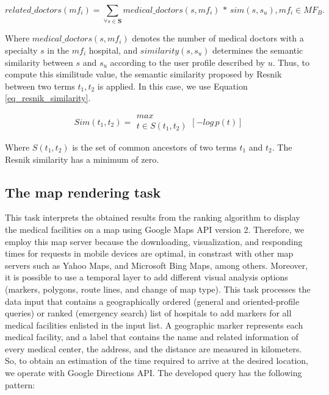 \documentclass[sustainability,article,submit,pdftex,moreauthors]{Definitions/mdpi}
\begin{document}

\begin{center}
\begin{equation}
related\_doctors(mf_{i}) = \sum_{\forall s \in \textbf{S}}medical\_doctors(s, mf_{i})\,\ast\,sim(s, s_u),mf_{i} \in MF_{B}. 
\label{eq_number_medical_doctors}
\end{equation}
\end{center}
 
Where $medical\_doctors(s, mf_{i})$ denotes the number of medical doctors with a specialty $s$ in the $mf_{i}$ hospital, and $similarity(s, s_u)$ determines the semantic similarity between $s$ and $s_u$ according to the user profile described by $u$. Thus, to compute this similitude value, the semantic similarity proposed by Resnik \cite{resnik2011semantic} between two terms $t_1, t_2$ is applied. In this case, we use Equation \ref{eq_resnik_similarity}. 

\begin{center}
\begin{equation}
Sim(t_1, t_2) =  \begin{matrix}{max} \\ {t \in S(t_1, t_2)}\end{matrix}  [-log \, p(t)]  
\label{eq_resnik_similarity}
\end{equation}
\end{center}

Where $S(t_1, t_2)$ is the set of common ancestors of two terms $t_1$ and $t_2$. The Resnik similarity has a minimum of zero.

\subsection{The map rendering task}
This task interprets the obtained results from the ranking algorithm to display the medical facilities on a map using Google Maps API version 2. Therefore, we employ this map server because the downloading, visualization, and responding times for requests in mobile devices are optimal, in constrast with other map servers such as Yahoo Maps, and Microsoft Bing Maps, among others. Moreover, it is possible to use a temporal layer to add different visual analysis options (markers, polygons, route lines, and change of map type). This task processes the data input that contains a geographically ordered (general and oriented-profile queries) or ranked (emergency search) list of hospitals to add markers for all medical facilities enlisted in the input list. A geographic marker represents each medical facility, and a label that contains the name and related information of every medical center, the address, and the distance are measured in kilometers. So, to obtain an estimation of the time required to arrive at the desired location, we operate with Google Directions API. The developed query has the following pattern:
\end{document}
